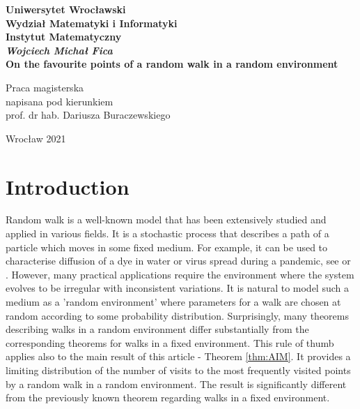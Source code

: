 \documentclass[12pt]{article}
\begin{document}
\newpage
\thispagestyle{empty}
\begin{center}
\textbf{\large Uniwersytet Wrocławski\\
Wydział Matematyki i Informatyki\\
Instytut Matematyczny}\\
\vspace{4cm}
\textbf{\textit{\large Wojciech Michał Fica}\\
\vspace{0.5cm}
{\Large On the favourite points of a random walk in a random environment}}\\
\end{center}
\vspace{3cm}
{\large \hspace*{5.5cm}Praca magisterska\\
\hspace*{5.5cm}napisana pod kierunkiem\\
\hspace*{5.5cm}prof. dr hab. Dariusza Buraczewskiego }\\
\vfill
\begin{center}
{\large Wrocław 2021}\\
\end{center}



\pagebreak
\tableofcontents
\pagebreak
\newpage

\section{Introduction}

Random walk is a well-known model that has been extensively studied and applied in various fields. It is a stochastic process that describes a path of a particle which moves in some fixed medium. For example, it can be used to characterise diffusion of a dye in water or virus spread during a pandemic, see \cite{COVID} or \cite{INTRO}. However, many practical applications require the environment where the system evolves to be irregular with inconsistent variations. It is natural to model such a medium as a 'random environment' where parameters for a walk are chosen at random according to some probability distribution. Surprisingly, many theorems describing walks in a random environment differ substantially from the corresponding theorems for walks in a fixed environment. This rule of thumb applies also to the main result of this article - Theorem \ref{thm:AIM}. It provides a limiting distribution of the number of visits to the most frequently visited points by a random walk in a random environment. The result is significantly different from the previously known theorem regarding walks in a fixed environment. 
\end{document}
